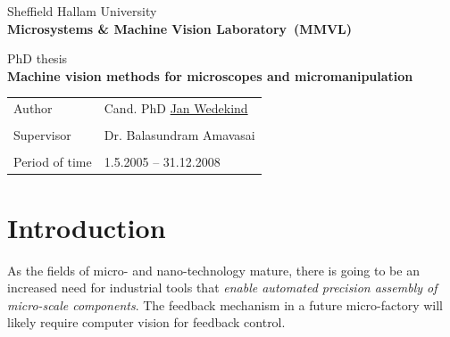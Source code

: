 \documentclass[a4paper,12pt]{book}
\newcommand{\thetitle}{Machine vision methods for microscopes and micromanipulation} %
\newcommand{\shu}{Sheffield Hallam University}
\newcommand{\theauthor}{\href{http://www.multimap.com/map/browse.cgi?pc=S62UE}{Jan Wedekind}}
\newcommand{\mmvl}{Microsystems \& Machine Vision Laboratory}
\begin{document}
\begin{titlepage}
  \noindent
  \begin{minipage}[c]{1.0cm}
  \end{minipage}
  \begin{minipage}[c]{\linewidth minus 1.0cm}
    \begin{textrm}
      \shu\\
      \textbf{\mmvl\ (MMVL)}
    \end{textrm}
  \end{minipage}
  \vfill\noindent
  {\huge
    PhD thesis
    \bigskip\\
    \textbf{\thetitle}}
  \vfill\noindent
  \begin{large}\noindent
    \begin{tabular}{ll}
      Author      & Cand. PhD \theauthor\\
      &\\
      Supervisor  & Dr. Balasundram Amavasai \\
      &\\
      Period of time & 1.5.2005 -- 31.12.2008\\
    \end{tabular}
  \end{large}
\end{titlepage}

\tableofcontents

\chapter{Introduction}
As the fields of micro- and nano-technology mature, there is going to be an
increased need for industrial tools that \emph{enable automated precision
assembly of micro-scale components}. The feedback mechanism in a future
micro-factory will likely require computer vision for feedback control.
\end{document}
